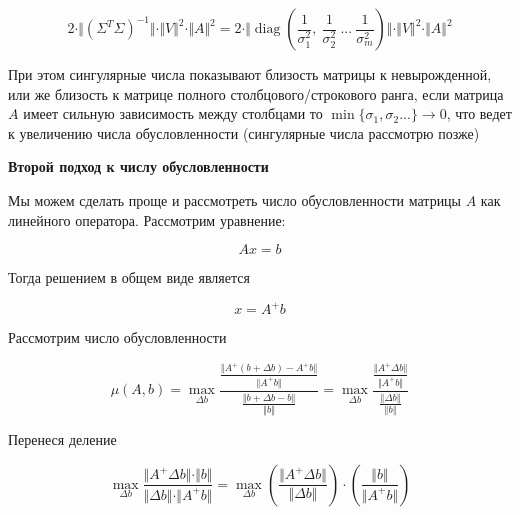 \documentclass{article}
\begin{document}
    \begin{equation}
        2 \cdot \Vert (\Sigma^{T} \Sigma)^{-1} \Vert \cdot \Vert V \Vert^{2} \cdot \Vert A \Vert^{2} = 2 \cdot \Vert     \operatorname{diag}(\frac{1}{\sigma_{1}^{2} }, \ \frac{1}{\sigma_{2}^{2} } \ ... \ \frac{1}{\sigma_{m}^{2} })\Vert \cdot \Vert V \Vert^{2} \cdot \Vert A \Vert^{2}
    \end{equation}

    При этом сингулярные числа показывают близость матрицы к невырожденной, или же близость к матрице полного столбцового/строкового ранга,
    если матрица $A$ имеет сильную зависимость между столбцами то $\min\{\sigma_{1}, \sigma_{2} ... \} \rightarrow 0$, что ведет к увеличению числа обусловленности (сингулярные числа рассмотрю позже)

    \quad

    \textbf{Второй подход к числу обусловленности}

    \quad

    Мы можем сделать проще и рассмотреть число обусловленности матрицы $A$ как линейного оператора.
    Рассмотрим уравнение:

    \begin{equation}
        Ax = b
    \end{equation}

    Тогда решением в общем виде является

    \begin{equation}
        x = A^{+} b
    \end{equation}

    Рассмотрим число обусловленности

    \begin{equation}
        \mu(A, b) = \max_{\Delta b} \frac{ \frac{\Vert A^{+} (b + \Delta b) - A^{+} b \Vert}{ \Vert A^{+} b \Vert } }{ \frac{\Vert b + \Delta b - b \Vert}{\Vert b \Vert} } =
        \max_{\Delta b} \frac{ \frac{\Vert A^{+} \Delta b \Vert}{ \Vert A^{+} b \Vert } }{ \frac{\Vert \Delta b \Vert}{\Vert b \Vert} }
    \end{equation}

    Перенеся деление

    \begin{equation}
        \max_{\Delta b} \frac{ \Vert A^{+} \Delta b \Vert \cdot  \Vert b \Vert   }{ \Vert \Delta b \Vert \cdot  \Vert A^{+} b \Vert } =
        \max_{\Delta b} (\frac{\Vert A^{+} \Delta b \Vert}{\Vert \Delta b \Vert}) \cdot (\frac{\Vert b \Vert }{\Vert A^{+} b \Vert})
    \end{equation}
\end{document}
